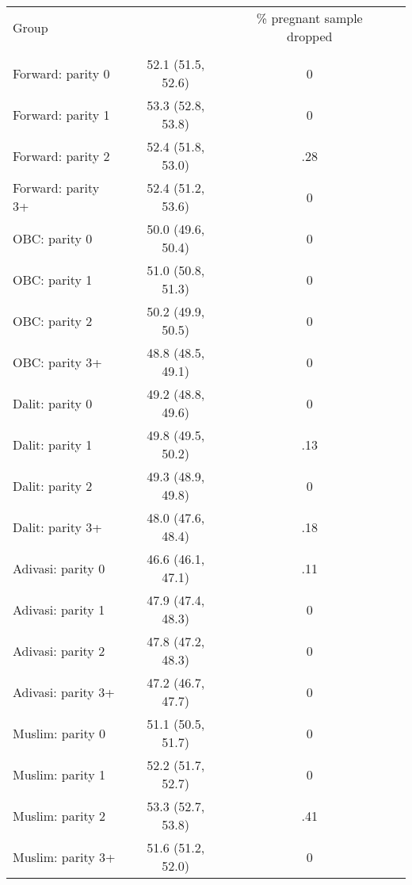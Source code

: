 \begin{tabular}{lccc}
\toprule
Group &  & \% pregnant sample dropped \\\\
\midrule
Forward: parity 0&52.1 (51.5, 52.6)&0\\
Forward: parity 1&53.3 (52.8, 53.8)&0\\
Forward: parity 2&52.4 (51.8, 53.0)&.28\\
Forward: parity 3+&52.4 (51.2, 53.6)&0\\
OBC: parity 0&50.0 (49.6, 50.4)&0\\
OBC: parity 1&51.0 (50.8, 51.3)&0\\
OBC: parity 2&50.2 (49.9, 50.5)&0\\
OBC: parity 3+&48.8 (48.5, 49.1)&0\\
Dalit: parity 0&49.2 (48.8, 49.6)&0\\
Dalit: parity 1&49.8 (49.5, 50.2)&.13\\
Dalit: parity 2&49.3 (48.9, 49.8)&0\\
Dalit: parity 3+&48.0 (47.6, 48.4)&.18\\
Adivasi: parity 0&46.6 (46.1, 47.1)&.11\\
Adivasi: parity 1&47.9 (47.4, 48.3)&0\\
Adivasi: parity 2&47.8 (47.2, 48.3)&0\\
Adivasi: parity 3+&47.2 (46.7, 47.7)&0\\
Muslim: parity 0&51.1 (50.5, 51.7)&0\\
Muslim: parity 1&52.2 (51.7, 52.7)&0\\
Muslim: parity 2&53.3 (52.7, 53.8)&.41\\
Muslim: parity 3+&51.6 (51.2, 52.0)&0\\
\bottomrule
\end{tabular}
